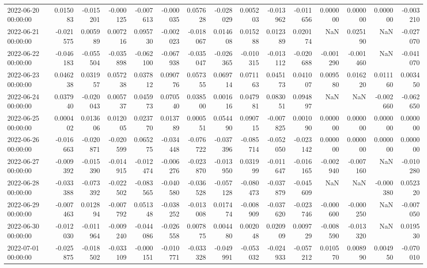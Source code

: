 \begin{tabular}{lrrrrrrrrrrrrrr}
2022-06-20 00:00:00 & 0.015083 & -0.015201 & -0.000125 & -0.007613 & -0.000035 & 0.057628 & -0.028029 & 0.005203 & -0.013962 & -0.011656 & 0.000000 & 0.000000 & 0.000000 & -0.003210 \\
2022-06-21 00:00:00 & -0.021575 & 0.005989 & 0.007216 & 0.095730 & -0.002023 & -0.018067 & 0.014608 & 0.015288 & 0.012389 & 0.020174 & NaN & 0.025190 & NaN & -0.027070 \\
2022-06-22 00:00:00 & -0.046183 & -0.055504 & -0.035898 & -0.062100 & -0.067938 & -0.035047 & -0.026365 & -0.010315 & -0.013112 & -0.020688 & -0.001290 & -0.001460 & NaN & -0.041070 \\
2022-06-23 00:00:00 & 0.046238 & 0.031957 & 0.057238 & 0.037812 & 0.090776 & 0.057355 & 0.069714 & 0.071163 & 0.045173 & 0.041007 & 0.009580 & 0.016220 & 0.011160 & 0.003450 \\
2022-06-24 00:00:00 & 0.037940 & -0.020043 & 0.005737 & 0.045973 & 0.070540 & 0.038500 & 0.001616 & 0.047981 & 0.083051 & 0.094897 & NaN & NaN & -0.002660 & -0.062650 \\
2022-06-25 00:00:00 & 0.000402 & 0.013606 & 0.012005 & 0.023770 & 0.013789 & 0.000551 & 0.054490 & 0.090715 & -0.007825 & 0.001090 & 0.000000 & 0.000000 & 0.000000 & 0.000000 \\
2022-06-26 00:00:00 & -0.016663 & -0.020871 & -0.020599 & 0.065275 & -0.034448 & -0.076722 & -0.037396 & -0.085714 & -0.052050 & -0.023142 & 0.000000 & 0.000000 & 0.000000 & 0.000000 \\
2022-06-27 00:00:00 & -0.009392 & -0.015390 & -0.014915 & -0.012474 & -0.006276 & -0.023870 & -0.013950 & 0.031999 & -0.011647 & -0.016165 & -0.002940 & -0.007160 & NaN & -0.010280 \\
2022-06-28 00:00:00 & -0.033388 & -0.073392 & -0.022502 & -0.083565 & -0.040580 & -0.036528 & -0.057128 & -0.080473 & -0.037879 & -0.045609 & NaN & NaN & -0.000380 & 0.052320 \\
2022-06-29 00:00:00 & -0.007463 & 0.012894 & -0.007792 & 0.051348 & -0.038252 & -0.013008 & 0.017474 & -0.008909 & -0.037620 & -0.023746 & -0.000600 & -0.000250 & NaN & -0.007050 \\
2022-06-30 00:00:00 & -0.012030 & -0.011964 & -0.009240 & -0.044086 & -0.026558 & 0.007875 & 0.004480 & 0.002048 & 0.020909 & 0.009729 & -0.008590 & -0.013320 & NaN & 0.019530 \\
2022-07-01 00:00:00 & -0.025875 & -0.018502 & -0.033109 & -0.000151 & -0.010771 & -0.033328 & -0.049991 & -0.053032 & -0.024933 & -0.057212 & 0.010570 & 0.008990 & 0.004950 & -0.070010 \\

\end{tabular}
